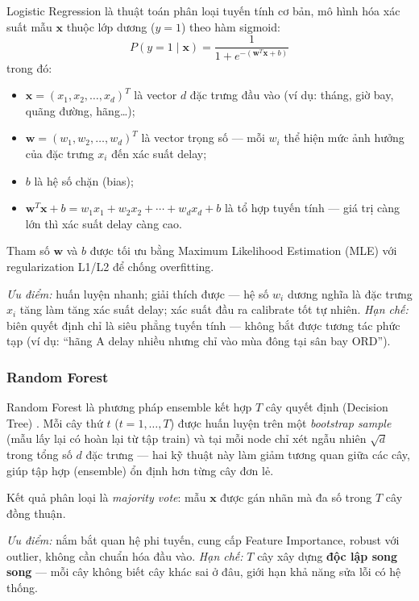 Logistic Regression là thuật toán phân loại tuyến tính cơ bản,
mô hình hóa xác suất mẫu $\mathbf{x}$ thuộc lớp dương ($y=1$)
theo hàm sigmoid:
\[
P(y=1 \mid \mathbf{x}) = \frac{1}{1 + e^{-(\mathbf{w}^T\mathbf{x} + b)}}
\]
trong đó:
\begin{itemize}
    \item $\mathbf{x} = (x_1, x_2, \ldots, x_d)^T$ là vector $d$ đặc trưng đầu vào
          (ví dụ: tháng, giờ bay, quãng đường, hãng\ldots);
    \item $\mathbf{w} = (w_1, w_2, \ldots, w_d)^T$ là vector trọng số ---
          mỗi $w_i$ thể hiện mức ảnh hưởng của đặc trưng $x_i$ đến xác suất delay;
    \item $b$ là hệ số chặn (bias);
    \item $\mathbf{w}^T\mathbf{x} + b = w_1 x_1 + w_2 x_2 + \cdots + w_d x_d + b$
          là tổ hợp tuyến tính --- giá trị càng lớn thì xác suất delay càng cao.
\end{itemize}
Tham số $\mathbf{w}$ và $b$ được tối ưu bằng Maximum Likelihood Estimation (MLE)
với regularization L1/L2 để chống overfitting.

\textit{Ưu điểm:} huấn luyện nhanh; giải thích được --- hệ số $w_i$ dương
nghĩa là đặc trưng $x_i$ tăng làm tăng xác suất delay;
xác suất đầu ra calibrate tốt tự nhiên.
\textit{Hạn chế:} biên quyết định chỉ là siêu phẳng tuyến tính ---
không bắt được tương tác phức tạp (ví dụ: ``hãng A delay nhiều
nhưng chỉ vào mùa đông tại sân bay ORD'').

\subsubsection{Random Forest}

Random Forest là phương pháp ensemble kết hợp $T$ cây quyết định
(Decision Tree) \cite{breiman2001random}.
Mỗi cây thứ $t$ ($t = 1, \ldots, T$) được huấn luyện trên một
\textit{bootstrap sample} (mẫu lấy lại có hoàn lại từ tập train)
và tại mỗi node chỉ xét ngẫu nhiên $\sqrt{d}$ trong tổng số $d$ đặc trưng
--- hai kỹ thuật này làm giảm tương quan giữa các cây,
giúp tập hợp (ensemble) ổn định hơn từng cây đơn lẻ.

Kết quả phân loại là \textit{majority vote}:
mẫu $\mathbf{x}$ được gán nhãn mà đa số trong $T$ cây đồng thuận.

\textit{Ưu điểm:} nắm bắt quan hệ phi tuyến, cung cấp Feature Importance,
robust với outlier, không cần chuẩn hóa đầu vào.
\textit{Hạn chế:} $T$ cây xây dựng \textbf{độc lập song song} ---
mỗi cây không biết cây khác sai ở đâu, giới hạn khả năng sửa lỗi có hệ thống.

